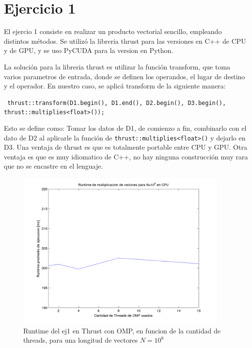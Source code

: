\section{Ejercicio 1}

El ejercio 1 consiste en realizar un producto vectorial sencillo, empleando distintos m\'etodos.
Se utiliz\'o la libreria thrust para las versiones en C++ de CPU y de GPU, y se uso PyCUDA para
la version en Python.

La soluci\'on para la libreria thrust es utilizar la funci\'on transform, que toma varios parametros
de entrada, donde se definen los operandos, el lugar de destino y el operador. En nuestro caso,
se aplic\'a transform de la siguiente manera:

\small{\texttt{
    thrust::transform(D1.begin(), D1.end(), D2.begin(), D3.begin(),\\
                       thrust::multiplies<float>());
               }}

Esto se define como: Tomar los datos de D1, de comienzo a fin, combinarlo con el dato de D2 al aplicarle la funci\'on 
de \texttt{thrust::multiplies<float>()} y dejarlo en D3. Una ventaja de thrust es que es totalmente 
portable entre CPU y GPU. Otra ventaja es que es muy idiomatico de C++, no hay ninguna construcci\'on muy rara
que no se encastre en el lenguaje. 

\def \hrwidth {300pt}


  \begin{figure}[H]
 \begin {center}
 \includegraphics[width=\hrwidth]{plots/ej1omp.png}
 \end {center}
 \caption{Runtime del ej1 en Thrust con OMP, en funcion de la cantidad de threads, para una longitud de vectores $N=10^8$}
 \label{fig:ej1OMP}
 \end{figure}

